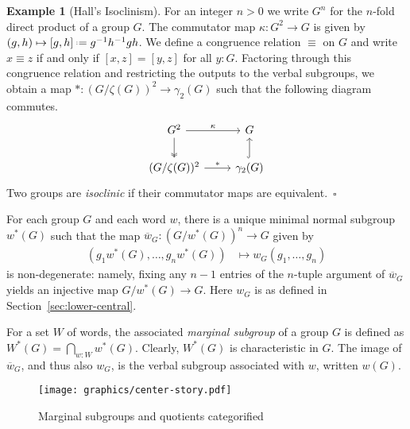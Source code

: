 \documentclass{amsart}
\numberwithin{lstfloat}{section}
\newcommand{\defeq}{\mathrel{\hstretch{.13}{=}\hspace{.2ex}{=}}}
\newcommand{\exqed}{\hfill $\square$}
\theoremstyle{definition}
\newtheorem{ex}[thm]{Example}
\theoremstyle{remark}
\numberwithin{equation}{section}
\begin{document}
\begin{ex}[Hall's Isoclinism]\label{ex:isoclinism}
 For an integer $n>0$ we write $G^n$ for the $n$-fold direct product 
of a group $G$. 
  The commutator map $\kappa:G^2 \to G$ 
is given by $(g,h) \mapsto [g,h]\defeq g^{-1}h^{-1}gh$.
We define a congruence relation
  $\equiv$ on $G$ and write $x\equiv z$ if and only if $[x,z]=[y,z]$ for all $y: G$.
Factoring through
  this congruence relation and restricting the outputs to the verbal subgroups,
  we obtain a 
map $*:(G/\zeta(G))^2\to \gamma_2(G)$ such that the following diagram commutes.
  \begin{equation*} 
    \begin{tikzcd}
      G^2\arrow[r,"{\kappa}"]\arrow[d,two heads] & G\\
      (G/\zeta(G))^2\arrow[r,"*"] & {\gamma_2(G)}\arrow[u,hook]
    \end{tikzcd}
  \end{equation*}  
  Two groups are \emph{isoclinic} if their 
commutator maps are equivalent.~\exqed
\end{ex}


For each group $G$ and each word $w$, there is a unique minimal normal subgroup $w^*(G)$ such that the
  map $\overline{w}_G : (G/w^*(G))^n \to G$ given by 
  \begin{align*}
    (g_1w^*(G),\dots, g_nw^*(G)) &\longmapsto w_G(g_1,\dots, g_n)
  \end{align*}
  is non-degenerate: namely,
fixing any $n-1$ entries of the $n$-tuple argument of 
$\overline{w}_G$ yields an injective map $G/w^*(G) \to G$. 
Here $w_G$ is as defined in Section~\ref{sec:lower-central}.

For a set $W$ of words, the associated \emph{marginal subgroup} of a group $G$ is defined as  $W^*(G)=\bigcap_{w:W} w^*(G)$. Clearly, $W^*(G)$ is characteristic in $G$. The image
of $\overline{w}_G$, and thus also $w_G$, is the verbal subgroup associated with
$w$, written $w(G)$. 
\begin{figure}[!tbp] 
  \centering
  \texttt{[image: graphics/center-story.pdf]}
  \caption{Marginal subgroups and quotients categorified}
  \label{fig:log-W-star} 
\end{figure}
\end{document}
